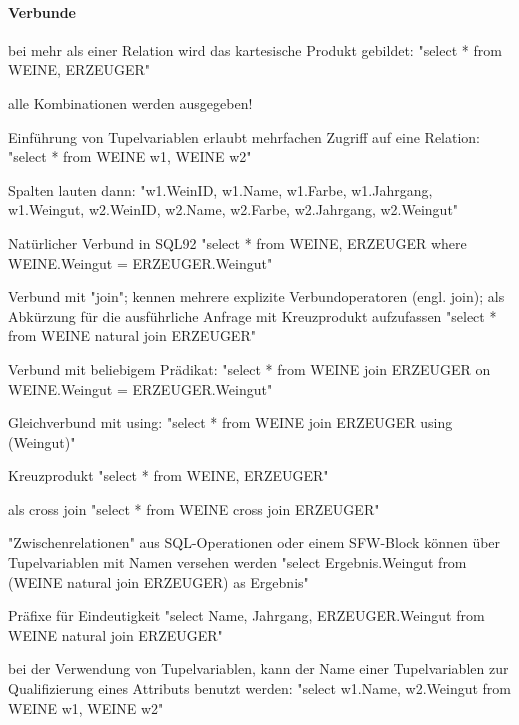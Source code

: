 \documentclass[a4paper]{article}
\begin{document}
\begin{multicols}{3}
\paragraph{Verbunde}
\begin{itemize*}
    \item bei mehr als einer Relation wird das kartesische Produkt gebildet:
    "select * from WEINE, ERZEUGER"
    \item alle Kombinationen werden ausgegeben!
    \item Einführung von Tupelvariablen erlaubt mehrfachen Zugriff auf eine Relation:
    "select * from WEINE w1, WEINE w2"
    \begin{itemize*}
        \item Spalten lauten dann:
        "w1.WeinID, w1.Name, w1.Farbe, w1.Jahrgang, w1.Weingut, w2.WeinID, w2.Name, w2.Farbe, w2.Jahrgang, w2.Weingut"
    \end{itemize*}
    \item Natürlicher Verbund in SQL92
    "select * from WEINE, ERZEUGER where WEINE.Weingut = ERZEUGER.Weingut"
    \item Verbund mit "join"; kennen mehrere explizite Verbundoperatoren (engl. join);  als Abkürzung für die ausführliche Anfrage mit Kreuzprodukt aufzufassen
    "select * from WEINE natural join ERZEUGER"
    \begin{itemize*}
        \item Verbund mit beliebigem Prädikat: "select * from WEINE join ERZEUGER on WEINE.Weingut = ERZEUGER.Weingut"
        \item Gleichverbund mit using: "select * from WEINE join ERZEUGER using (Weingut)"
    \end{itemize*}
    \item Kreuzprodukt "select * from WEINE, ERZEUGER"
    \item als cross join "select * from WEINE cross join ERZEUGER"
    \item "Zwischenrelationen" aus SQL-Operationen oder einem SFW-Block können über Tupelvariablen mit Namen versehen werden
    "select Ergebnis.Weingut from (WEINE natural join ERZEUGER) as Ergebnis"
    \item Präfixe für Eindeutigkeit "select Name, Jahrgang, ERZEUGER.Weingut from WEINE natural join ERZEUGER"
    \item bei der Verwendung von Tupelvariablen, kann der Name einer Tupelvariablen zur Qualifizierung eines Attributs benutzt werden:
    "select w1.Name, w2.Weingut from WEINE w1, WEINE w2"
\end{itemize*}


\end{multicols}
\end{document}
